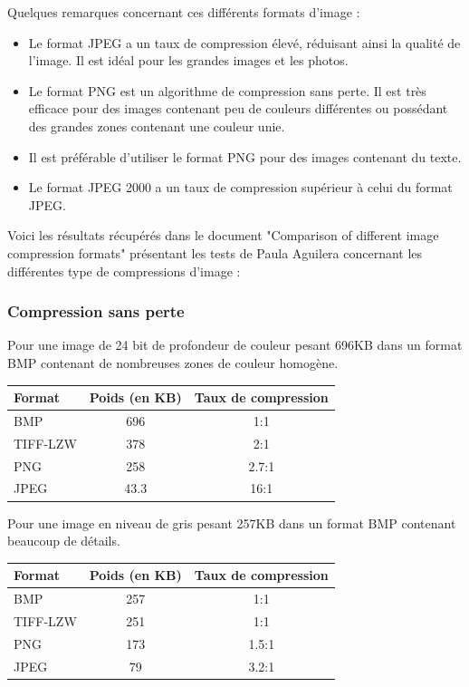 \documentclass[a4paper, 11pt]{article} %
\begin{document}
Quelques remarques concernant ces différents formats d'image : 

\begin{itemize}
  \item Le format JPEG a un taux de compression élevé, réduisant ainsi la qualité de l'image. Il est idéal pour les grandes images et les photos.
	\item Le format PNG est un algorithme de compression sans perte. Il est très efficace pour des images contenant peu de couleurs différentes ou possédant des grandes zones contenant une couleur unie.
	\item Il est préférable d'utiliser le format PNG pour des images contenant du texte.
	\item Le format JPEG 2000 a un taux de compression supérieur à celui du format JPEG.
\end{itemize}

Voici les résultats récupérés dans le document "Comparison of different image compression formats"\cite{compression:images-compression-formats} présentant les tests de Paula Aguilera concernant les différentes type de compressions d'image :

\subsubsection{Compression sans perte}
Pour une image de 24 bit de profondeur de couleur pesant 696KB dans un format BMP contenant de nombreuses zones de couleur homogène.

\begin{center}
\centering
	\begin{tabular}{|l|c|c|}
		\hline
		Format & Poids (en KB)& Taux de compression\\
		\hline
		BMP&696&1:1\\
		TIFF-LZW&378&2:1\\
		PNG&258&2.7:1\\
		JPEG&43.3&16:1\\
		\hline
	\end{tabular}
\end {center}

Pour une image en niveau de gris pesant 257KB dans un format BMP contenant beaucoup de détails.
\begin{center}
\centering
	\begin{tabular}{|l|c|c|}
		\hline
		Format & Poids (en KB)& Taux de compression\\
		\hline
		BMP&257&1:1\\
		TIFF-LZW&251&1:1\\
		PNG&173&1.5:1\\
		JPEG&79&3.2:1\\
		\hline
	\end{tabular}
\end{center}
\end{document}
